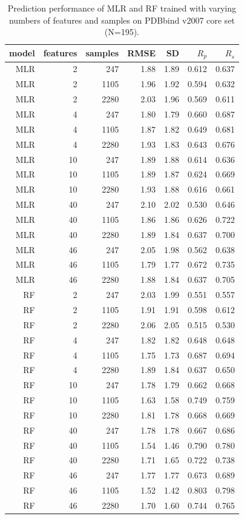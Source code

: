 \documentclass[journal=jacsat,manuscript=article]{achemso}
\begin{document}
\begin{table}
\caption{Prediction performance of MLR and RF trained with varying numbers of features and samples on PDBbind v2007 core set (N=195).}
\label{tbl:tst195}
\begin{tabular}{rrrrrrr}
\hline
model & features & samples & RMSE & SD & $R_p$ & $R_s$\\
\hline
MLR &  2 &  247 & 1.88 & 1.89 & 0.612 & 0.637\\
MLR &  2 & 1105 & 1.96 & 1.92 & 0.594 & 0.632\\
MLR &  2 & 2280 & 2.03 & 1.96 & 0.569 & 0.611\\
MLR &  4 &  247 & 1.80 & 1.79 & 0.660 & 0.687\\
MLR &  4 & 1105 & 1.87 & 1.82 & 0.649 & 0.681\\
MLR &  4 & 2280 & 1.93 & 1.83 & 0.643 & 0.676\\
MLR & 10 &  247 & 1.89 & 1.88 & 0.614 & 0.636\\
MLR & 10 & 1105 & 1.89 & 1.87 & 0.624 & 0.669\\
MLR & 10 & 2280 & 1.93 & 1.88 & 0.616 & 0.661\\
MLR & 40 &  247 & 2.10 & 2.02 & 0.530 & 0.646\\
MLR & 40 & 1105 & 1.86 & 1.86 & 0.626 & 0.722\\
MLR & 40 & 2280 & 1.89 & 1.84 & 0.637 & 0.700\\
MLR & 46 &  247 & 2.05 & 1.98 & 0.562 & 0.638\\
MLR & 46 & 1105 & 1.79 & 1.77 & 0.672 & 0.735\\
MLR & 46 & 2280 & 1.88 & 1.84 & 0.637 & 0.705\\
 RF &  2 &  247 & 2.03 & 1.99 & 0.551 & 0.557\\
 RF &  2 & 1105 & 1.91 & 1.91 & 0.598 & 0.612\\
 RF &  2 & 2280 & 2.06 & 2.05 & 0.515 & 0.530\\
 RF &  4 &  247 & 1.82 & 1.82 & 0.648 & 0.648\\
 RF &  4 & 1105 & 1.75 & 1.73 & 0.687 & 0.694\\
 RF &  4 & 2280 & 1.89 & 1.84 & 0.637 & 0.650\\
 RF & 10 &  247 & 1.78 & 1.79 & 0.662 & 0.668\\
 RF & 10 & 1105 & 1.63 & 1.58 & 0.749 & 0.759\\
 RF & 10 & 2280 & 1.81 & 1.78 & 0.668 & 0.669\\
 RF & 40 &  247 & 1.78 & 1.78 & 0.667 & 0.686\\
 RF & 40 & 1105 & 1.54 & 1.46 & 0.790 & 0.780\\
 RF & 40 & 2280 & 1.71 & 1.65 & 0.722 & 0.738\\
 RF & 46 &  247 & 1.77 & 1.77 & 0.673 & 0.689\\
 RF & 46 & 1105 & 1.52 & 1.42 & 0.803 & 0.798\\
 RF & 46 & 2280 & 1.70 & 1.60 & 0.744 & 0.765\\
\hline
\end{tabular}
\end{table}
\end{document}
